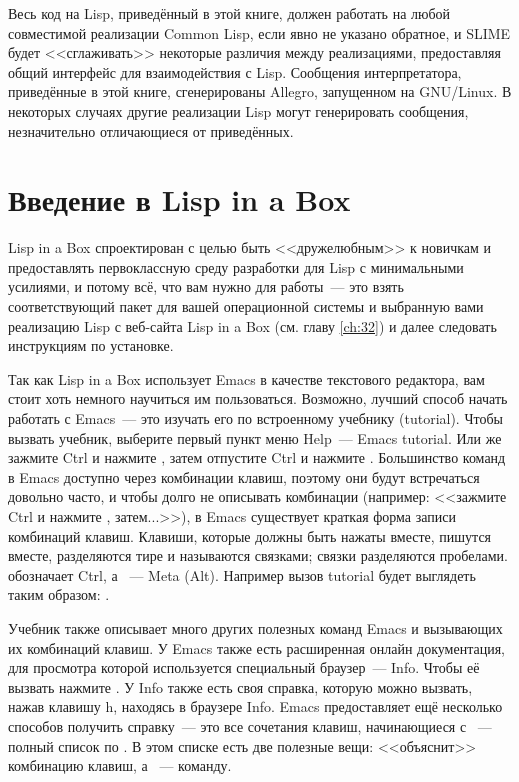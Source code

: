 Весь код на Lisp, приведённый в этой книге, должен работать на любой совместимой
реализации Common Lisp, если явно не указано обратное, и SLIME будет <<сглаживать>>
некоторые различия между реализациями, предоставляя общий интерфейс для взаимодействия с
Lisp. Сообщения интерпретатора, приведённые в этой книге, сгенерированы Allegro,
запущенном на GNU/Linux. В некоторых случаях другие реализации Lisp могут
генерировать сообщения, незначительно отличающиеся от приведённых.

\section{Введение в Lisp in a Box}

Lisp in a Box спроектирован с целью быть <<дружелюбным>> к новичкам и предоставлять
первоклассную среду разработки для Lisp с минимальными усилиями, и потому всё, что вам нужно
для работы~--- это взять соответствующий пакет для вашей операционной системы и выбранную
вами реализацию Lisp с веб-сайта Lisp in a Box (см. главу \ref{ch:32}) и далее следовать
инструкциям по установке.

Так как Lisp in a Box использует Emacs в качестве текстового редактора, вам стоит хоть
немного научиться им пользоваться. Возможно, лучший способ начать работать с Emacs~--- это
изучать его по встроенному учебнику (tutorial). Чтобы вызвать учебник, выберите первый
пункт меню Help~--- Emacs tutorial. Или же зажмите Ctrl и нажмите , затем отпустите Ctrl и
нажмите . Большинство команд в Emacs доступно через комбинации клавиш, поэтому они будут
встречаться довольно часто, и чтобы долго не описывать комбинации (например: <<зажмите Ctrl
и нажмите , затем...>>), в Emacs существует краткая форма записи комбинаций
клавиш. Клавиши, которые должны быть нажаты вместе, пишутся вместе, разделяются тире и
называются связками; связки разделяются пробелами.  обозначает Ctrl, а ~--- Meta
(Alt). Например вызов tutorial будет выглядеть таким образом: .

Учебник также описывает много других полезных команд Emacs и вызывающих их комбинаций
клавиш. У Emacs также есть расширенная онлайн документация, для просмотра которой
используется специальный браузер~--- Info. Чтобы её вызвать нажмите . У Info также
есть своя справка, которую можно вызвать, нажав клавишу h, находясь в браузере Info. Emacs
предоставляет ещё несколько способов получить справку~--- это все сочетания клавиш,
начинающиеся с ~--- полный список по . В этом списке есть две
полезные вещи:  <<объяснит>> комбинацию клавиш, а ~--- команду.

